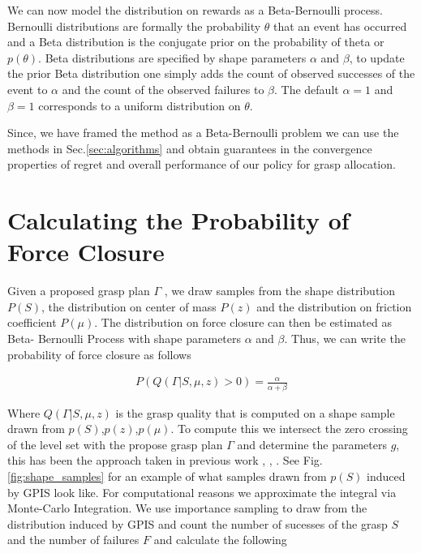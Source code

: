 \documentclass[letterpaper, 10 pt, conference]{ieeeconf}  %
\begin{document}
We can now model the distribution on rewards as a Beta-Bernoulli process. Bernoulli distributions are formally the probability $\theta$ that an event has occurred and a Beta distribution is the conjugate prior on the probability of theta or $p(\theta)$. Beta distributions are specified by shape parameters $\alpha$ and $\beta$, to update the prior Beta distribution one simply adds the count of observed successes of the event to $\alpha$ and the count of the observed failures to $\beta$. The default $\alpha =1 $ and $\beta =1$ corresponds to a uniform distribution on $\theta$. 

Since, we have framed the method as a Beta-Bernoulli problem we can use the methods in Sec.\ref{sec:algorithms} and obtain guarantees in the convergence properties of regret and overall performance of our policy for grasp allocation. 





\section{Calculating the Probability of Force Closure}
Given a proposed grasp plan $\Gamma$ , we draw samples from the shape distribution $P (S )$, the distribution on center of mass $P (z)$ and the distribution on friction coefficient $P (\mu)$. The distribution on force closure can then be estimated as Beta- Bernoulli Process with shape parameters $\alpha$ and $\beta$. Thus, we can write the probability of force closure as follows


\vspace{-2ex}
\begin{align}\label{eq:shape_sampling}
P(Q(\Gamma|S,\mu,z) > 0) = \frac{\alpha}{\alpha + \beta}
\end{align}



Where $Q(\Gamma|S,\mu,z)$ is the grasp quality that is computed on a shape sample drawn from $p(S)$,$p(z)$,$p(\mu)$. To compute this we intersect the zero crossing of the level set with the propose grasp plan $\Gamma$ and determine the parameters $g$, this has been the approach taken in previous work  \cite{kehoe2012estimating}, \cite{kehoe2012toward},  \cite{christopoulos2007handling}. See Fig. \ref{fig:shape_samples} for an example of what samples drawn from $p(S)$ induced by GPIS look like. For computational reasons we approximate the integral via Monte-Carlo Integration. We use importance sampling to draw from the distribution induced by GPIS and  count the number of sucesses of the grasp $S$ and the number of failures $F$ and calculate the following
\end{document}
